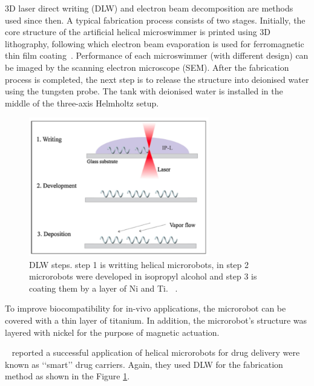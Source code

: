 \documentclass[12pt,a4paper,titlepage]{report}
\begin{document}
3D laser direct writing (DLW) and electron beam decomposition are methods used since then. A typical 
fabrication process consists of two stages. Initially, the core structure of the artificial helical 
microswimmer is printed using 3D lithography, following which electron beam evaporation is used for 
ferromagnetic thin film coating~\citep{tottori2013artificial}.  
Performance of each microswimmer (with different design) can be imaged by the scanning electron
 microscope (SEM). After the fabrication process is completed, the next step is to release the structure into 
deionised water using the tungsten probe. The tank with deionised water is installed in the middle of the 
three-axis Helmholtz setup. 




\begin{figure}
  \centering
    \includegraphics[width=0.7\textwidth]{tempreture}
  \caption[Direct lasor writing]{DLW steps. step 1 is writting helical microrobots, in step 2 microrobots were 
developed in isopropyl alcohol and step 3 is coating them by a layer of Ni and Ti. ~\citep{qiu2014artificial}.}
  \label{tempreture}
\end{figure}




To improve biocompatibility for in-vivo applications, the 
microrobot can be covered with a thin layer of titanium. In addition, the microrobot\rq{}s structure was layered with 
nickel for the purpose of magnetic actuation.

\citeauthor{qiu2014artificial}~\citep{qiu2014artificial} reported a successful application of helical microrobots
for drug delivery were known as \lq\lq{}smart\rq\rq{} drug carriers. Again, they used DLW for the fabrication method 
as shown in the Figure \ref{tempreture}. 
\end{document}

